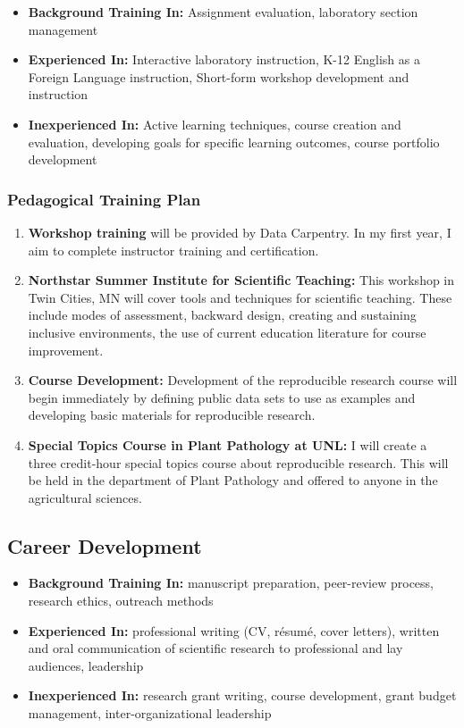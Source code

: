 \documentclass[12pt,letterpaper]{article}
\begin{document}
\begin{itemize}
  \item \textbf{Background Training In:} Assignment evaluation, laboratory section management
  \item \textbf{Experienced In:} Interactive laboratory instruction, K-12 English as a Foreign Language instruction, Short-form workshop development and
  instruction
  \item \textbf{Inexperienced In:} Active learning techniques, course creation and evaluation, developing goals for specific learning outcomes, course portfolio development
\end{itemize}

\subsubsection{Pedagogical Training Plan}

\begin{enumerate}
  \item \textbf{Workshop training} will be provided by Data Carpentry. In my first year, I aim to complete instructor training and certification.
  \item \textbf{Northstar Summer Institute for Scientific Teaching:} This workshop in Twin Cities, MN will cover tools and techniques for scientific teaching. These include modes of assessment, backward design, creating and sustaining inclusive environments, the use of current education literature for course improvement.
  \item \textbf{Course Development:} Development of the reproducible research course will begin immediately by defining public data sets to use as examples and developing basic materials for reproducible research.
  \item \textbf{Special Topics Course in Plant Pathology at UNL:} I will create a three credit-hour special topics course about reproducible research. This will be held in the department of Plant Pathology and offered to anyone in the agricultural sciences. 
\end{enumerate}


\subsection{Career Development}

\begin{itemize}
  \item \textbf{Background Training In:} 
  manuscript preparation, peer-review process, research ethics, outreach methods
  \item \textbf{Experienced In:} 
  professional writing (CV, r\'esum\'e, cover letters), written and oral communication of scientific research to professional and lay audiences, leadership
  \item \textbf{Inexperienced In:} research grant writing, course development, grant budget management, inter-organizational leadership
\end{itemize}
\end{document}

